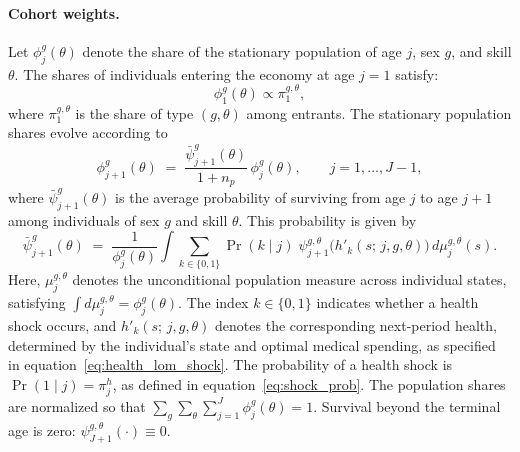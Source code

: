 \documentclass[12pt,a4paper]{article}
\begin{document}
\paragraph{Cohort weights.}
Let $\phi_j^{g}(\theta)$ denote the share of the stationary population of age $j$, sex $g$, and skill $\theta$. The shares of individuals entering the economy at age $j=1$ satisfy:
\[
\phi_1^g(\theta) \propto \pi_1^{g,\theta},
\]
where $\pi_1^{g,\theta}$ is the share of type $(g,\theta)$ among entrants. The stationary population shares evolve according to
\begin{equation}
\label{eq:cohort_weights}
\phi_{j+1}^{g}(\theta) \;=\; \frac{\bar{\psi}_{j+1}^{g}(\theta)}{1 + n_p}\, \phi_{j}^{g}(\theta), \qquad j = 1, \ldots, J-1,
\end{equation}
where $\bar{\psi}_{j+1}^{g}(\theta)$ is the average probability of surviving from age $j$ to age $j+1$ among individuals of sex $g$ and skill $\theta$. This probability is given by
\begin{equation}
\label{eq:avg_survival}
\bar{\psi}_{j+1}^{g}(\theta)
\;=\;
\frac{1}{\phi_{j}^{g}(\theta)} \int \sum_{k \in \{0,1\}} \Pr(k \mid j)\;
\psi_{j+1}^{g,\theta}\bigl(h'_k(s;\, j, g, \theta)\bigr)\, d\mu_j^{g,\theta}(s).
\end{equation}
Here, $\mu_j^{g,\theta}$ denotes the unconditional population measure across individual states, satisfying $\int d\mu_j^{g,\theta} = \phi_j^{g}(\theta)$. The index $k \in \{0,1\}$ indicates whether a health shock occurs, and $h'_k(s;\, j, g, \theta)$ denotes the corresponding next-period health, determined by the individual's state and optimal medical spending, as specified in equation~\eqref{eq:health_lom_shock}. The probability of a health shock is $\Pr(1 \mid j) = \pi^h_j$, as defined in equation~\eqref{eq:shock_prob}. The population shares are normalized so that $\sum_g \sum_\theta \sum_{j=1}^{J} \phi_j^{g}(\theta) = 1$. Survival beyond the terminal age is zero: $\psi_{J+1}^{g,\theta}(\cdot) \equiv 0$.
\end{document}
